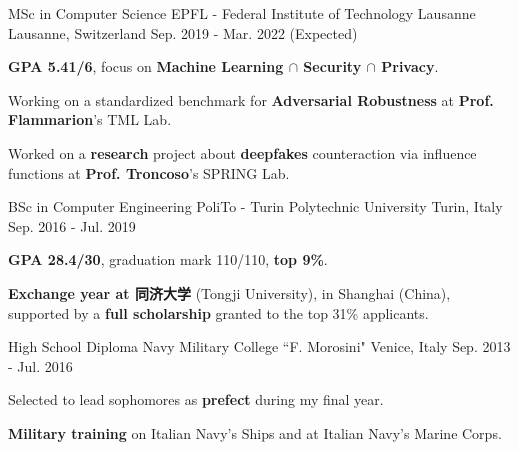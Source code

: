 

\begin{cventries}

  \cventry
  {MSc in Computer Science} %
  {EPFL - Federal Institute of Technology Lausanne} %
  {Lausanne, Switzerland} %
  {Sep. 2019 - Mar. 2022 (Expected)} %
  {
    \begin{cvitems} %
      \item \textbf{GPA 5.41/6}, focus on \textbf{Machine Learning $\cap$ Security $\cap$ Privacy}.
      \item Working on a standardized benchmark for \textbf{Adversarial Robustness} at \textbf{Prof. Flammarion}'s TML Lab.
      \item Worked on a \textbf{research} project about \textbf{deepfakes} counteraction via influence functions at \textbf{Prof. Troncoso}'s SPRING Lab.
    \end{cvitems}
  }
  \cventry
  {BSc in Computer Engineering} %
  {PoliTo - Turin Polytechnic University} %
  {Turin, Italy} %
  {Sep. 2016 - Jul. 2019} %
  {
    \begin{cvitems} %
      \item \textbf{GPA 28.4/30}, graduation mark 110/110, \textbf{top 9\%}.
      \item \textbf{Exchange year at 同济大学} (Tongji University), in Shanghai (China), supported by a \textbf{full scholarship} granted to the top 31\% applicants. \vspace{0.2cm}
    \end{cvitems}
  }
  \cventry
  {High School Diploma} %
  {Navy Military College ``F. Morosini"} %
  {Venice, Italy} %
  {Sep. 2013 - Jul. 2016} %
  {
    \begin{cvitems} %
      \item Selected to lead sophomores as \textbf{prefect} during my final year.
      \item \textbf{Military training} on Italian Navy's Ships and at Italian Navy's Marine Corps.
    \end{cvitems}
  }

\end{cventries}
